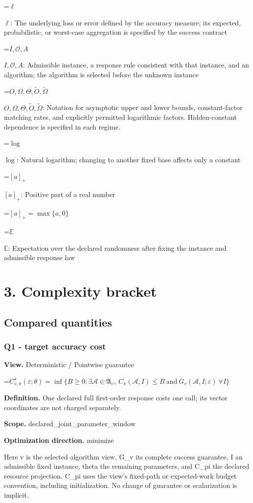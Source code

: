 \documentclass[10pt,a4paper]{article}
\newcommand{\AtlasMath}[1]{\par\begingroup\centering\setbox0=\hbox{$\displaystyle #1$}\ifdim\wd0>1.4\linewidth\typeout{ATLAS WIDE FORMULA: \the\wd0}\fi\ifdim\wd0>\linewidth\resizebox{\linewidth}{!}{\box0}\else\box0\fi\par\endgroup}
\newcommand{\AtlasInlineMath}[1]{\begingroup\setbox0=\hbox{$#1$}\ifdim\wd0>.4\linewidth\endgroup\AtlasMath{#1}\else\endgroup$#1$\fi}
\begin{document}
\AtlasInlineMath{\ell}: The underlying loss or error defined by the accuracy measure; its expected, probabilistic, or worst-case aggregation is specified by the success contract

\AtlasInlineMath{I,\mathcal{O},A}: Admissible instance, a response rule consistent with that instance, and an algorithm; the algorithm is selected before the unknown instance

\AtlasInlineMath{O,\Omega,\Theta,\widetilde{O},\widetilde\Omega}: Notation for asymptotic upper and lower bounds, constant-factor matching rates, and explicitly permitted logarithmic factors. Hidden-constant dependence is specified in each regime.

\AtlasInlineMath{\log}: Natural logarithm; changing to another fixed base affects only a constant

\AtlasInlineMath{[a]_+}: Positive part of a real number


\AtlasMath{[a]_+=\max\{a,0\}}


\AtlasInlineMath{\mathbb{E}}: Expectation over the declared randomness after fixing the instance and admissible response law

\section{3. Complexity bracket}
\subsection{Compared quantities}
\subsubsection{Q1 - target accuracy cost}
\textbf{View.} Deterministic / Pointwise guarantee

\AtlasMath{C^\star_{v,\pi}(\varepsilon;\theta)=\inf\{B\ge0:\exists\mathcal A\in\mathfrak A_v,\ C_\pi(\mathcal A,I)\le B\ \text{and}\ G_v(\mathcal A,I;\varepsilon)\ \forall I\}}
\textbf{Definition.} One declared full first-order response costs one call; its vector coordinates are not charged separately.

\textbf{Scope.} declared\_joint\_parameter\_window

\textbf{Optimization direction.} minimize

Here v is the selected algorithm view, G\_v its complete success guarantee, I an admissible fixed instance, theta the remaining parameters, and C\_pi the declared resource projection. C\_pi uses the view's fixed-path or expected-work budget convention, including initialization. No change of guarantee or scalarization is implicit.
\end{document}
